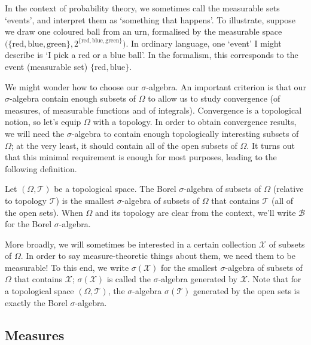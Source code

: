 \documentclass[11pt,letterpaper,reqno,oneside]{article}
\begin{document}
In the context of probability theory, we sometimes call the measurable sets `events', and interpret them as `something that happens'. To illustrate, suppose we draw one coloured ball from an urn, formalised by the measurable space $\bigl( \{\text{red},\text{blue},\text{green}\}, 2^{\{\text{red},\text{blue},\text{green}\}} \bigr)$. In ordinary language, one `event' I might describe is `I pick a red or a blue ball'. In the formalism, this corresponds to the event (measurable set) $\{\text{red},\text{blue}\}$.


We might wonder how to choose our $\sigma$-algebra. An important criterion is that our $\sigma$-algebra contain enough subsets of $\Omega$ to allow us to study convergence (of measures, of measurable functions and of integrals). Convergence is a topological notion, so let's equip $\Omega$ with a topology. In order to obtain convergence results, we will need the $\sigma$-algebra to contain enough topologically interesting subsets of $\Omega$; at the very least, it should contain all of the open subsets of $\Omega$. It turns out that this minimal requirement is enough for most purposes, leading to the following definition.

\begin{definition}
	Let $(\Omega,\mathcal{T})$ be a topological space. The Borel $\sigma$-algebra of subsets of $\Omega$ (relative to topology $\mathcal{T}$) is the smallest $\sigma$-algebra of subsets of $\Omega$ that contains $\mathcal{T}$ (all of the open sets). When $\Omega$ and its topology are clear from the context, we'll write $\mathcal{B}$ for the Borel $\sigma$-algebra.
\end{definition}

More broadly, we will sometimes be interested in a certain collection $\mathcal{X}$ of subsets of $\Omega$. In order to say measure-theoretic things about them, we need them to be measurable! To this end, we write $\sigma(\mathcal{X})$ for the smallest $\sigma$-algebra of subsets of $\Omega$ that contains $\mathcal{X}$; $\sigma(\mathcal{X})$ is called the $\sigma$-algebra generated by $\mathcal{X}$. Note that for a topological space $(\Omega,\mathcal{T})$, the $\sigma$-algebra $\sigma(\mathcal{T})$ generated by the open sets is exactly the Borel $\sigma$-algebra.



\subsection{Measures}
\label{sec:probability:measures}
\end{document}
